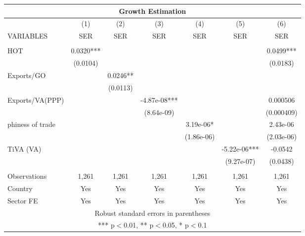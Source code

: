 \documentclass[]{article}
\begin{document}
\begin{tabular}{lcccccc}
\multicolumn{7}{c}{Growth Estimation} \\ \hline
 & (1) & (2) & (3) & (4) & (5) & (6) \\
VARIABLES & SER & SER & SER & SER & SER & SER \\ \hline
 &  &  &  &  &  &  \\
HOT & 0.0320*** &  &  &  &  & 0.0499*** \\
 & (0.0104) &  &  &  &  & (0.0183) \\
Exports/GO &  & 0.0246** &  &  &  &  \\
 &  & (0.0113) &  &  &  &  \\
Exports/VA(PPP) &  &  & -4.87e-08*** &  &  & 0.000506 \\
 &  &  & (8.64e-09) &  &  & (0.000409) \\
phiness of trade &  &  &  & 3.19e-06* &  & 2.43e-06 \\
 &  &  &  & (1.86e-06) &  & (2.03e-06) \\
TiVA (VA) &  &  &  &  & -5.22e-06*** & -0.0542 \\
 &  &  &  &  & (9.27e-07) & (0.0438) \\
 &  &  &  &  &  &  \\
Observations & 1,261 & 1,261 & 1,261 & 1,261 & 1,261 & 1,261 \\
Country & Yes & Yes & Yes & Yes & Yes & Yes \\
 Sector FE & Yes & Yes & Yes & Yes & Yes & Yes \\ \hline
\multicolumn{7}{c}{ Robust standard errors in parentheses} \\
\multicolumn{7}{c}{ *** p$<$0.01, ** p$<$0.05, * p$<$0.1} \\
\end{tabular}
\end{document}

